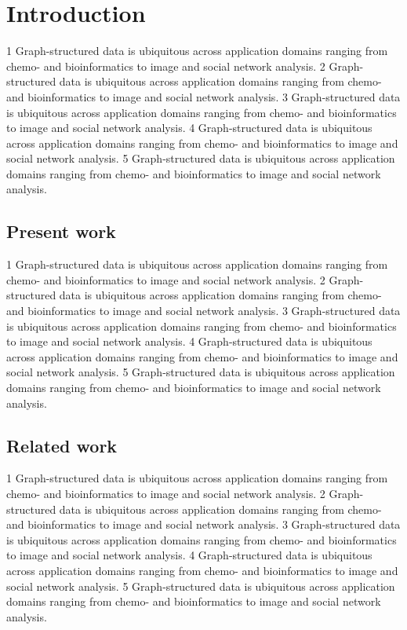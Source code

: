 \documentclass[sigconf]{acmart}
\begin{document}
\section{Introduction}
1 Graph-structured data is ubiquitous across application domains ranging from chemo- and bioinformatics to image and social network analysis.
2 Graph-structured data is ubiquitous across application domains ranging from chemo- and bioinformatics to image and social network analysis.
3 Graph-structured data is ubiquitous across application domains ranging from chemo- and bioinformatics to image and social network analysis.
4 Graph-structured data is ubiquitous across application domains ranging from chemo- and bioinformatics to image and social network analysis.
5 Graph-structured data is ubiquitous across application domains ranging from chemo- and bioinformatics to image and social network analysis.

\subsection{Present work}
1 Graph-structured data is ubiquitous across application domains ranging from chemo- and bioinformatics to image and social network analysis.
2 Graph-structured data is ubiquitous across application domains ranging from chemo- and bioinformatics to image and social network analysis.
3 Graph-structured data is ubiquitous across application domains ranging from chemo- and bioinformatics to image and social network analysis.
4 Graph-structured data is ubiquitous across application domains ranging from chemo- and bioinformatics to image and social network analysis.
5 Graph-structured data is ubiquitous across application domains ranging from chemo- and bioinformatics to image and social network analysis.

\subsection{Related work}
1 Graph-structured data is ubiquitous across application domains ranging from chemo- and bioinformatics to image and social network analysis.
2 Graph-structured data is ubiquitous across application domains ranging from chemo- and bioinformatics to image and social network analysis.
3 Graph-structured data is ubiquitous across application domains ranging from chemo- and bioinformatics to image and social network analysis.
4 Graph-structured data is ubiquitous across application domains ranging from chemo- and bioinformatics to image and social network analysis.
5 Graph-structured data is ubiquitous across application domains ranging from chemo- and bioinformatics to image and social network analysis.
\end{document}
